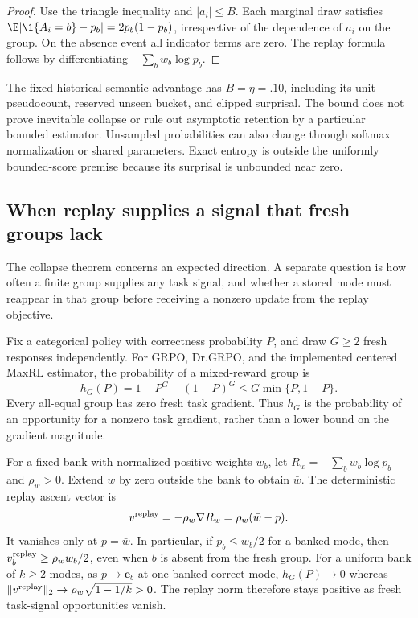 \begin{proof}
Use the triangle inequality and $|a_i|\le B$. Each marginal draw satisfies
$\E|\1\{A_i=b\}-p_b|=2p_b(1-p_b)$, irrespective of the dependence of
$a_i$ on the group. On the absence event all indicator terms are zero.
The replay formula follows by differentiating $-\sum_b w_b\log p_b$.
\end{proof}

The fixed historical semantic advantage has $B=\eta=.10$, including its
unit pseudocount, reserved unseen bucket, and clipped surprisal. The bound
does not prove inevitable collapse or rule out asymptotic retention by a
particular bounded estimator. Unsampled probabilities can also change through
softmax normalization or shared parameters. Exact entropy is outside the
uniformly bounded-score premise because its surprisal is unbounded near zero.

\subsection{When replay supplies a signal that fresh groups lack}
\label{app:theory-gradient-availability}

The collapse theorem concerns an expected direction. A separate question is
how often a finite group supplies any task signal, and whether a stored mode
must reappear in that group before receiving a nonzero update from the replay objective.

\begin{lemma}
\label{lem:replay-gradient-availability}
Fix a categorical policy with correctness probability $P$, and draw $G\ge2$
fresh responses independently. For GRPO, Dr.GRPO, and the implemented centered
MaxRL estimator, the probability of a mixed-reward group is
\[
 h_G(P)=1-P^G-(1-P)^G\le G\min\{P,1-P\}.
\]
Every all-equal group has zero fresh task gradient. Thus $h_G$ is the
probability of an opportunity for a nonzero task gradient, rather than a
lower bound on the gradient magnitude.

For a fixed bank with normalized positive weights $w_b$, let
$R_w=-\sum_b w_b\log p_b$ and $\rho_w>0$. Extend $w$ by zero outside the
bank to obtain $\bar w$. The deterministic replay ascent vector is
\[
 v^{\rm replay}=-\rho_w\nabla R_w=\rho_w(\bar w-p).
\]
It vanishes only at $p=\bar w$. In particular, if $p_b\le w_b/2$ for a banked
mode, then $v^{\rm replay}_b\ge\rho_w w_b/2$, even when $b$ is absent from the
fresh group. For a uniform bank of $k\ge2$ modes, as $p\to\mathbf e_b$ at
one banked correct mode, $h_G(P)\to0$ whereas
$\|v^{\rm replay}\|_2\to\rho_w\sqrt{1-1/k}>0$.
The replay norm therefore stays positive as fresh task-signal opportunities vanish.
\end{lemma}

